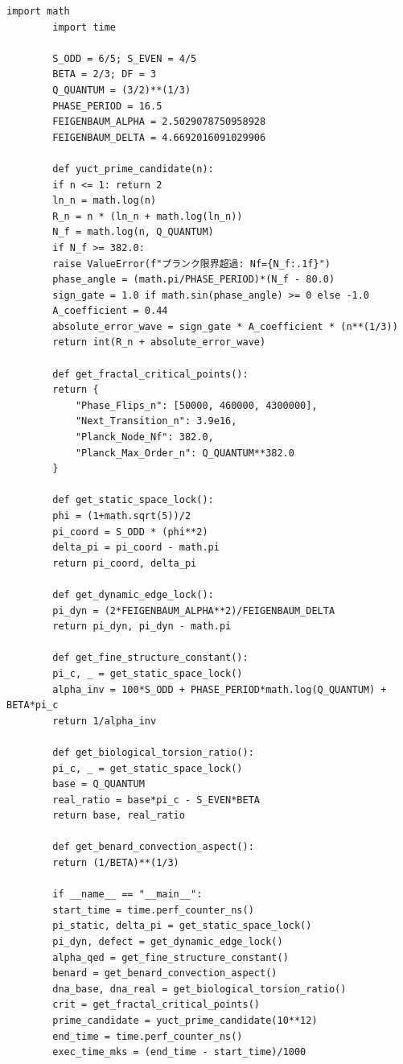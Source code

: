 \documentclass[12pt,a4paper]{article}
\begin{document}
	\begin{lstlisting}[caption={完全 YUCT 座標エンジン v4.0 (\texttt{yuct\_constants.py})}, label={lst:yuct-engine}]
		import math
		import time
		
		S_ODD = 6/5; S_EVEN = 4/5
		BETA = 2/3; DF = 3
		Q_QUANTUM = (3/2)**(1/3)
		PHASE_PERIOD = 16.5
		FEIGENBAUM_ALPHA = 2.5029078750958928
		FEIGENBAUM_DELTA = 4.6692016091029906
		
		def yuct_prime_candidate(n):
		if n <= 1: return 2
		ln_n = math.log(n)
		R_n = n * (ln_n + math.log(ln_n))
		N_f = math.log(n, Q_QUANTUM)
		if N_f >= 382.0:
		raise ValueError(f"プランク限界超過: Nf={N_f:.1f}")
		phase_angle = (math.pi/PHASE_PERIOD)*(N_f - 80.0)
		sign_gate = 1.0 if math.sin(phase_angle) >= 0 else -1.0
		A_coefficient = 0.44
		absolute_error_wave = sign_gate * A_coefficient * (n**(1/3))
		return int(R_n + absolute_error_wave)
		
		def get_fractal_critical_points():
		return {
			"Phase_Flips_n": [50000, 460000, 4300000],
			"Next_Transition_n": 3.9e16,
			"Planck_Node_Nf": 382.0,
			"Planck_Max_Order_n": Q_QUANTUM**382.0
		}
		
		def get_static_space_lock():
		phi = (1+math.sqrt(5))/2
		pi_coord = S_ODD * (phi**2)
		delta_pi = pi_coord - math.pi
		return pi_coord, delta_pi
		
		def get_dynamic_edge_lock():
		pi_dyn = (2*FEIGENBAUM_ALPHA**2)/FEIGENBAUM_DELTA
		return pi_dyn, pi_dyn - math.pi
		
		def get_fine_structure_constant():
		pi_c, _ = get_static_space_lock()
		alpha_inv = 100*S_ODD + PHASE_PERIOD*math.log(Q_QUANTUM) + BETA*pi_c
		return 1/alpha_inv
		
		def get_biological_torsion_ratio():
		pi_c, _ = get_static_space_lock()
		base = Q_QUANTUM
		real_ratio = base*pi_c - S_EVEN*BETA
		return base, real_ratio
		
		def get_benard_convection_aspect():
		return (1/BETA)**(1/3)
		
		if __name__ == "__main__":
		start_time = time.perf_counter_ns()
		pi_static, delta_pi = get_static_space_lock()
		pi_dyn, defect = get_dynamic_edge_lock()
		alpha_qed = get_fine_structure_constant()
		benard = get_benard_convection_aspect()
		dna_base, dna_real = get_biological_torsion_ratio()
		crit = get_fractal_critical_points()
		prime_candidate = yuct_prime_candidate(10**12)
		end_time = time.perf_counter_ns()
		exec_time_mks = (end_time - start_time)/1000
		

\end{lstlisting}
\end{document}
